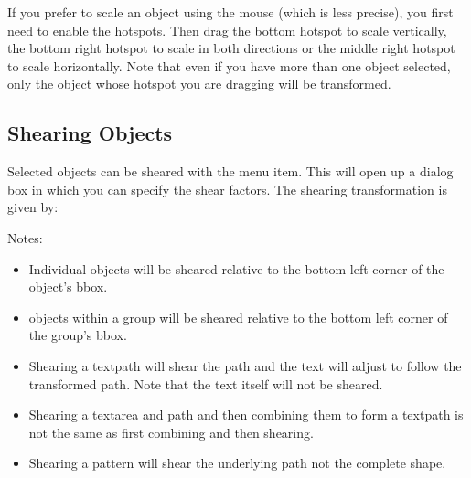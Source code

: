 If you prefer to scale an \gls{object} using the mouse (which is
less precise), you first need to \hyperref[mi:hotspots]{enable the
hotspots}. Then drag the bottom  hotspot to scale
vertically, the bottom right hotspot to scale in both directions or
the middle right hotspot to scale horizontally. Note that even if
you have more than one object selected, only the object whose
hotspot you are dragging will be transformed.




\subsection{Shearing Objects}\label{sec:shearobjects}


Selected \glspl{object} can be sheared with
the  menu item. This will open up a dialog box
in which you can specify the shear factors. The shearing
transformation is given by:
\TeXParserLibToImage
[div=displaymath,alt={
 (
   [ 1 , sX ]
   [ sY , 1 ]
 )
 (
   [ x ]
   [ y ]
 )
=
 (
   [ x + sX \texttimes\ y ]
   [ y + sY \texttimes\ x ]
 )
}]
{
\[
  \left(
  \begin{array}{cc}
  1 & s_x\\
  s_y & 1
  \end{array}
  \right)
  \left(
  \begin{array}{c}
  x\\
  y
  \end{array}
  \right)
  =
  \left(
  \begin{array}{l}
  x + s_x y\\
  y + s_y x
  \end{array}
  \right)
  \]
}

Notes:
\begin{itemize}
\item Individual \glspl*{object}
will be sheared relative to the bottom left corner of the
object's \gls{bbox}.

\item \Glspl*{object} within a 
\gls{group} will be sheared relative to the bottom
left corner of the group's \gls*{bbox}.

\item Shearing a \gls{textpath} will shear the path and the text
will adjust to follow the transformed path. Note that the text
itself will not be sheared.

\item Shearing a \gls*{textarea} and \gls*{path} and then combining
them to form a \gls*{textpath} is not the same as first combining
and then shearing. 

\item Shearing a \gls{pattern} will shear the underlying path not
the complete shape.
\end{itemize}

